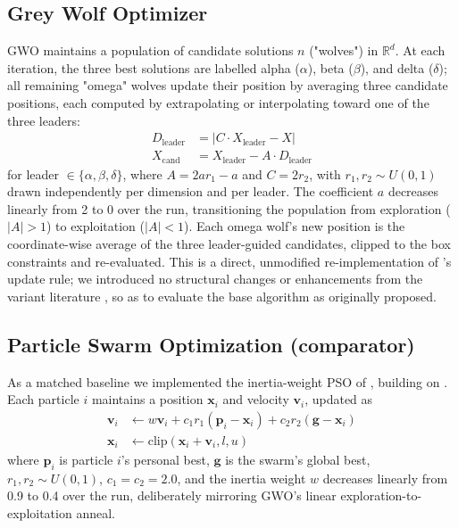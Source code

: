 \documentclass[journal]{IEEEtran}
\begin{document}
\subsection{Grey Wolf Optimizer} 
GWO maintains a population of candidate solutions $n$ ("wolves") in $\mathbb{R}^d$. At each iteration, the three best solutions are labelled alpha ($\alpha$), beta ($\beta$), and delta ($\delta$); all remaining "omega" wolves update their position by averaging three candidate positions, each computed by extrapolating or interpolating toward one of the three leaders:
\begin{align}
D_{\text{leader}} &= |C \cdot X_{\text{leader}} - X| \\
X_{\text{cand}} &= X_{\text{leader}} - A \cdot D_{\text{leader}}
\end{align}
for leader $\in \{\alpha,\beta,\delta\}$, where $A = 2ar_1 - a$ and $C = 2r_2$, with $r_1,r_2 \sim U(0,1)$ drawn independently per dimension and per leader. The coefficient $a$ decreases linearly from 2 to 0 over the run, transitioning the population from exploration ($|A|>1$) to exploitation ($|A|<1$). Each omega wolf's new position is the coordinate-wise average of the three leader-guided candidates, clipped to the box constraints and re-evaluated. This is a direct, unmodified re-implementation of \cite{mirjalili2014}'s update rule; we introduced no structural changes or enhancements from the variant literature \cite{faris2018}, so as to evaluate the base algorithm as originally proposed.


\subsection{Particle Swarm Optimization (comparator)}
As a matched baseline we implemented the inertia-weight PSO of \cite{shi1998}, building on \cite{kennedy1995}. Each particle $i$ maintains a position $\mathbf{x}_i$ and velocity $\mathbf{v}_i$, updated as
\begin{align}
\mathbf{v}_i &\leftarrow w\mathbf{v}_i + c_1 r_1(\mathbf{p}_i - \mathbf{x}_i) + c_2 r_2(\mathbf{g}-\mathbf{x}_i) \\
\mathbf{x}_i &\leftarrow \text{clip}(\mathbf{x}_i + \mathbf{v}_i, l, u)
\end{align}
where $\mathbf{p}_i$ is particle $i$'s personal best, $\mathbf{g}$ is the swarm's global best, $r_1, r_2 \sim U(0,1) $,  $c_1=c_2=2.0$, and the inertia weight $w$ decreases linearly from 0.9 to 0.4 over the run, deliberately mirroring GWO's linear exploration-to-exploitation anneal. 
\end{document}
